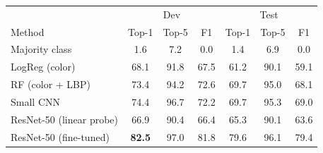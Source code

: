 \begin{tabular}{lccc|ccc}
\toprule
 & \multicolumn{3}{c|}{Dev} & \multicolumn{3}{c}{Test} \\
Method & Top-1 & Top-5 & F1 & Top-1 & Top-5 & F1 \\
\midrule
Majority class & 1.6 & 7.2 & 0.0 & 1.4 & 6.9 & 0.0 \\
LogReg (color) & 68.1 & 91.8 & 67.5 & 61.2 & 90.1 & 59.1 \\
RF (color + LBP) & 73.4 & 94.2 & 72.6 & 69.7 & 95.0 & 68.1 \\
Small CNN & 74.4 & 96.7 & 72.2 & 69.7 & 95.3 & 69.0 \\
ResNet-50 (linear probe) & 66.9 & 90.4 & 66.4 & 65.3 & 90.1 & 63.6 \\
ResNet-50 (fine-tuned) & \textbf{82.5} & 97.0 & 81.8 & 79.6 & 96.1 & 79.4 \\
\bottomrule
\end{tabular}
